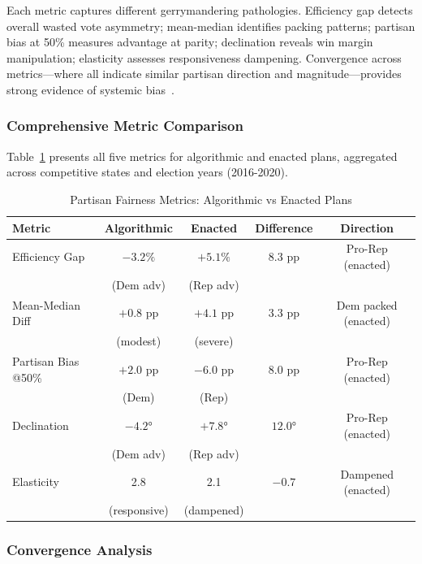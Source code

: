 Each metric captures different gerrymandering pathologies. Efficiency gap detects overall wasted vote asymmetry; mean-median identifies packing patterns; partisan bias at 50\% measures advantage at parity; declination reveals win margin manipulation; elasticity assesses responsiveness dampening. Convergence across metrics---where all indicate similar partisan direction and magnitude---provides strong evidence of systemic bias~\cite{mcghee2017measuring}.

\subsubsection{Comprehensive Metric Comparison}

Table~\ref{tab:multiple-metrics} presents all five metrics for algorithmic and enacted plans, aggregated across competitive states and election years (2016-2020).

\begin{table}[h]
\centering
\caption{Partisan Fairness Metrics: Algorithmic vs Enacted Plans}
\label{tab:multiple-metrics}
\begin{tabular}{lcccc}
\toprule
\textbf{Metric} & \textbf{Algorithmic} & \textbf{Enacted} & \textbf{Difference} & \textbf{Direction} \\
\midrule
Efficiency Gap & $-3.2\%$ & $+5.1\%$ & $8.3$ pp & Pro-Rep (enacted) \\
 & (Dem adv) & (Rep adv) & & \\
\midrule
Mean-Median Diff & $+0.8$ pp & $+4.1$ pp & $3.3$ pp & Dem packed (enacted) \\
 & (modest) & (severe) & & \\
\midrule
Partisan Bias @50\% & $+2.0$ pp & $-6.0$ pp & $8.0$ pp & Pro-Rep (enacted) \\
 & (Dem) & (Rep) & & \\
\midrule
Declination & $-4.2°$ & $+7.8°$ & $12.0°$ & Pro-Rep (enacted) \\
 & (Dem adv) & (Rep adv) & & \\
\midrule
Elasticity & 2.8 & 2.1 & $-0.7$ & Dampened (enacted) \\
 & (responsive) & (dampened) & & \\
\bottomrule
\end{tabular}
\end{table}

\subsubsection{Convergence Analysis}

